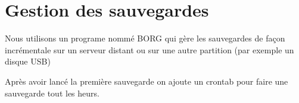 \section{Gestion des sauvegardes}
Nous utilisons un programe nommé BORG qui gère les sauvegardes de façon incrémentale sur un serveur distant ou sur une autre partition (par exemple un disque USB)


Après avoir lancé la première sauvegarde on ajoute un crontab pour faire une sauvegarde tout les heurs.
